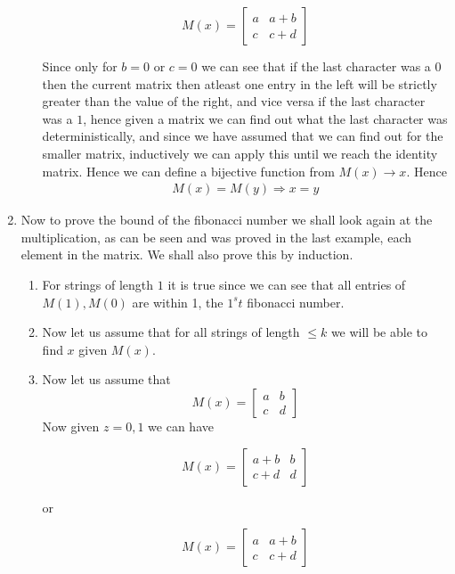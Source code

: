 \documentclass{assignment}
\begin{document}
\begin{problemlist}
\begin{problem}
\begin{answer}
\begin{enumerate}
\begin{enumerate}
\begin{equation}
M(x) = 
\begin{bmatrix}
 a & a+b \\
 c & c+d 
\end{bmatrix}
\end{equation}
 
Since only for $b=0$ or $c=0$ we can see that if the last character was a $0$ then the current matrix then atleast one entry in the left will be strictly greater than the value of the right, and vice versa if the last character was a $1$, hence given a matrix we can find out what the last character was deterministically, and since we have assumed that we can find out for the smaller matrix, inductively we can apply this until we reach the identity matrix. Hence we can define a bijective function from $M(x) \rightarrow x$. Hence
\begin{eqnarray}
 M(x) = M(y) \Rightarrow x =y 
\end{eqnarray}

\end{enumerate}
\item Now to prove the bound of the fibonacci number we shall look again at the multiplication, as can be seen and was proved in the last example, each element in the matrix. We shall also prove this by induction. 
\begin{enumerate}
 \item  For strings of length $1$ it is true since we can see that all entries of $M(1), M(0)$ are within 1, the $1^st$ fibonacci number.
 \item Now let us assume that for all strings of length $\leq k$ we will be able to find $x$ given $M(x)$.
 \item Now let us assume that  
\begin{equation}
M(x) = 
\begin{bmatrix}
  a & b \\
  c & d 
 \end{bmatrix}
\end{equation}
Now given $z=0,1$ we can have 

\begin{equation}
M(x) = 
\begin{bmatrix}
 a+b & b \\
 c+d & d 
\end{bmatrix}
\end{equation}

or 

\begin{equation}
M(x) = 
\begin{bmatrix}
 a & a+b \\
 c & c+d 
\end{bmatrix}
\end{equation}


\end{enumerate}
\end{enumerate}
\end{answer}
\end{problem}
\end{problemlist}
\end{document}
